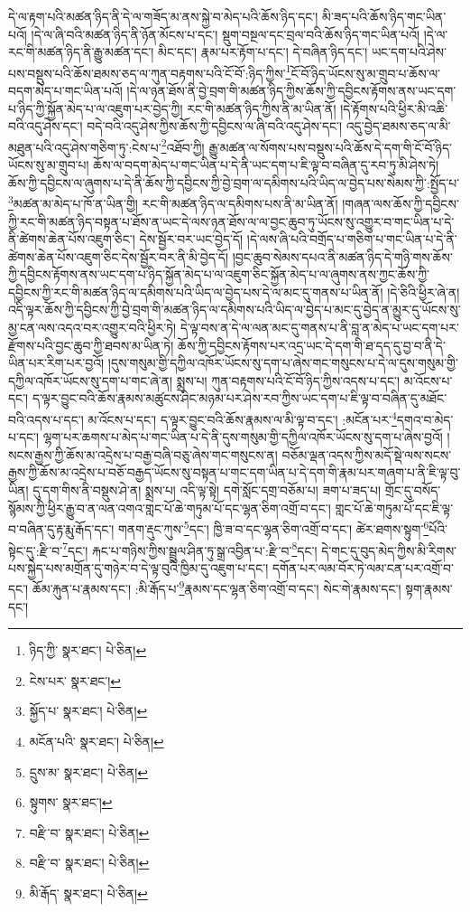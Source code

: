དེ་ལ་རྟག་པའི་མཚན་ཉིད་ནི་དེ་ལ་གཟོད་མ་ནས་སྐྱེ་བ་མེད་པའི་ཆོས་ཉིད་དང་། མི་ཟད་པའི་ཆོས་ཉིད་གང་ཡིན་པའོ། །དེ་ལ་ཞི་བའི་མཚན་ཉིད་ནི་ཉོན་མོངས་པ་དང་། སྡུག་བསྔལ་དང་བྲལ་བའི་ཆོས་ཉིད་གང་ཡིན་པའོ། །དེ་ལ་རང་གི་མཚན་ཉིད་ནི་རྒྱུ་མཚན་དང་། མིང་དང་། རྣམ་པར་རྟོག་པ་དང་། དེ་བཞིན་ཉིད་དང་། ཡང་དག་པའི་ཤེས་པས་བསྡུས་པའི་ཆོས་ཐམས་ཅད་ལ་ཀུན་བརྟགས་པའི་ངོ་བོ་:ཉིད་ཀྱིས་\footnote{ཉིད་ཀྱི་  སྣར་ཐང་།  པེ་ཅིན། }ངོ་བོ་ཉིད་ཡོངས་སུ་མ་གྲུབ་པ་ཆོས་ལ་བདག་མེད་པ་གང་ཡིན་པའོ། །དེ་ལ་ཉན་ཐོས་ནི་བྱེ་བྲག་གི་མཚན་ཉིད་ཀྱིས་ཆོས་ཀྱི་དབྱིངས་རྟོགས་ནས་ཡང་དག་པ་ཉིད་ཀྱི་སྐྱོན་མེད་པ་ལ་འཇུག་པར་བྱེད་ཀྱི། རང་གི་མཚན་ཉིད་ཀྱིས་ནི་མ་ཡིན་ནོ། །དེ་རྟོགས་པའི་ཕྱིར་མི་འཆི་བའི་འདུ་ཤེས་དང་། བདེ་བའི་འདུ་ཤེས་ཀྱིས་ཆོས་ཀྱི་དབྱིངས་ལ་ཞི་བའི་འདུ་ཤེས་དང་། འདུ་བྱེད་ཐམས་ཅད་ལ་མི་མཐུན་པའི་འདུ་ཤེས་གཅིག་ཏུ་:ངེས་པ་\footnote{ངེས་པར་  སྣར་ཐང་། }འཐོབ་ཀྱི། རྒྱུ་མཚན་ལ་སོགས་པས་བསྡུས་པའི་ཆོས་དེ་དག་གི་ངོ་བོ་ཉིད་ཡོངས་སུ་མ་གྲུབ་པ། ཆོས་ལ་བདག་མེད་པ་གང་ཡིན་པ་དེ་ནི་ཡང་དག་པ་ཇི་ལྟ་བ་བཞིན་དུ་རབ་ཏུ་མི་ཤེས་ཏེ། ཆོས་ཀྱི་དབྱིངས་ལ་ཞུགས་པ་དེ་ནི་ཆོས་ཀྱི་དབྱིངས་ཀྱི་བྱེ་བྲག་ལ་དམིགས་པའི་ཡིད་ལ་བྱེད་པས་སེམས་ཀྱི་:སྤྱོད་པ་\footnote{སྐྱོད་པ་  སྣར་ཐང་།  པེ་ཅིན། }མཚན་མ་མེད་པ་ཁོ་ན་ཡིན་གྱི། རང་གི་མཚན་ཉིད་ལ་དམིགས་པས་ནི་མ་ཡིན་ནོ། །གཞན་ལས་ཆོས་ཀྱི་དབྱིངས་ཀྱི་རང་གི་མཚན་ཉིད་བསྟན་པ་ཐོས་ན་ཡང་དེ་ལས་ཉན་ཐོས་ལ་ལ་བྱང་ཆུབ་ཏུ་ཡོངས་སུ་འགྱུར་བ་གང་ཡིན་པ་དེ་ནི་ཚེགས་ཆེན་པོས་འཇུག་ཅིང་། དེས་སྦྱོར་བར་ཡང་བྱེད་དོ། །དེ་ལས་ཞི་པའི་བགྲོད་པ་གཅིག་པ་གང་ཡིན་པ་དེ་ནི་ཚེགས་ཆེན་པོས་འཇུག་ཅིང་དེས་སྦྱོར་བར་ནི་མི་བྱེད་དོ། །བྱང་ཆུབ་སེམས་དཔའ་ནི་མཚན་ཉིད་དེ་གཉི་གས་ཆོས་ཀྱི་དབྱིངས་རྟོགས་ནས་ཡང་དག་པ་ཉིད་སྐྱོན་མེད་པ་ལ་འཇུག་ཅིང་སྐྱོན་མེད་པ་ལ་ཞུགས་ནས་ཀྱང་ཆོས་ཀྱི་དབྱིངས་ཀྱི་རང་གི་མཚན་ཉིད་ལ་དམིགས་པའི་ཡིད་ལ་བྱེད་པས་དེ་ལ་མང་དུ་གནས་པ་ཡིན་ནོ། །དེ་ཅིའི་ཕྱིར་ཞེ་ན། འདི་ལྟར་ཆོས་ཀྱི་དབྱིངས་ཀྱི་བྱེ་བྲག་གི་མཚན་ཉིད་ལ་དམིགས་པའི་ཡིད་ལ་བྱེད་པ་མང་དུ་བྱེད་ན་མྱུར་དུ་ཡོངས་སུ་མྱ་ངན་ལས་འདའ་བར་འགྱུར་བའི་ཕྱིར་ཏེ། དེ་ལྟ་བས་ན་དེ་ལ་ལན་མང་དུ་གནས་པ་ནི་བླ་ན་མེད་པ་ཡང་དག་པར་རྫོགས་པའི་བྱང་ཆུབ་ཀྱི་ཐབས་མ་ཡིན་ཏེ། ཆོས་ཀྱི་དབྱིངས་རྟོགས་པར་འདྲ་ཡང་དེ་དག་གི་ཐ་དད་དུ་བྱ་བ་ནི་དེ་ཡིན་པར་རིག་པར་བྱའོ། །དུས་གསུམ་གྱི་དཀྱིལ་འཁོར་ཡོངས་སུ་དག་པ་ཞེས་གང་གསུངས་པ་དེ་ལ་དུས་གསུམ་གྱི་དཀྱིལ་འཁོར་ཡོངས་སུ་དག་པ་གང་ཞེ་ན། སྨྲས་པ། ཀུན་བརྟགས་པའི་ངོ་བོ་ཉིད་ཀྱིས་འདས་པ་དང་། མ་འོངས་པ་དང་། ད་ལྟར་བྱུང་བའི་ཆོས་རྣམས་མཚུངས་ཤིང་མཉམ་པར་ཤེས་རབ་ཀྱིས་ཡང་དག་པ་ཇི་ལྟ་བ་བཞིན་དུ་མཐོང་བའི་འདས་པ་དང་། མ་འོངས་པ་དང་། ད་ལྟར་བྱུང་བའི་ཆོས་རྣམས་ལ་མི་ལྟ་བ་དང་། :མངོན་པར་\footnote{མངོན་པའི་  སྣར་ཐང་།  པེ་ཅིན། }དགའ་བ་མེད་པ་དང་། ལྷག་པར་ཆགས་པ་མེད་པ་གང་ཡིན་པ་དེ་ནི་དུས་གསུམ་གྱི་དཀྱིལ་འཁོར་ཡོངས་སུ་དག་པ་ཞེས་བྱའོ། །སངས་རྒྱས་ཀྱི་ཆོས་མ་འདྲེས་པ་བརྒྱ་བཞི་བཅུ་ཞེས་གང་གསུངས་ན། བཅོམ་ལྡན་འདས་ཀྱིས་མདོ་སྡེ་ལས་སངས་རྒྱས་ཀྱི་ཆོས་མ་འདྲེས་པ་བཅོ་བརྒྱད་ཡོངས་སུ་བསྟན་པ་གང་དག་ཡིན་པ་དེ་དག་གི་རྣམ་པར་གཞག་པ་ནི་ཇི་ལྟ་བུ་ཡིན། དུ་དག་གིས་ནི་བསྡུས་ཤེ་ན། སྨྲས་པ། འདི་ལྟ་སྟེ། དགེ་སློང་དགྲ་བཅོམ་པ། ཟག་པ་ཟད་པ། གྲོང་དུ་བསོད་སྙོམས་ཀྱི་ཕྱིར་རྒྱུ་བ་ན་ལན་འགའ་གླང་པོ་ཆེ་གཏུམ་པོ་དང་ལྷན་ཅིག་འགྲོ་བ་དང་། གླང་པོ་ཆེ་གཏུམ་པོ་དང་ཇི་ལྟ་བ་བཞིན་དུ་རྟ་རྨུ་རྒོད་དང་། གནག་རྡུང་ཀུས་\footnote{དྲུས་མ་  སྣར་ཐང་།  པེ་ཅིན། }དང་། ཁྱི་ཟ་བ་དང་ལྷན་ཅིག་འགྲོ་བ་དང་། ཚེར་ཐགས་སྟུག་\footnote{སྟུགས་  སྣར་ཐང་། }པོའི་སྟེང་དུ་:རྫི་བ་\footnote{བརྫི་བ་  སྣར་ཐང་།  པེ་ཅིན། }དང་། རྐང་པ་གཉིས་ཀྱིས་སྦྲུལ་ཤིན་ཏུ་སྒྲ་འབྱིན་པ་:རྫི་བ་\footnote{བརྫི་བ་  སྣར་ཐང་།  པེ་ཅིན། }དང་། དེ་གང་དུ་བུད་མེད་ཀྱིས་མི་རིགས་པས་སྐྱེད་པས་མགྲོན་དུ་གཉེར་བ་དེ་ལྟ་བུའི་ཁྱིམ་དུ་འཇུག་པ་དང་། དགོན་པར་ལམ་བོར་ཏེ་ལམ་ངན་པར་འགྲོ་བ་དང་། ཆོམ་རྐུན་པ་རྣམས་དང་། :མི་རྒོད་པ་\footnote{མི་རྒོད་  སྣར་ཐང་།  པེ་ཅིན། }རྣམས་དང་ལྷན་ཅིག་འགྲོ་བ་དང་། སེང་གེ་རྣམས་དང་། སྟག་རྣམས་དང་། 